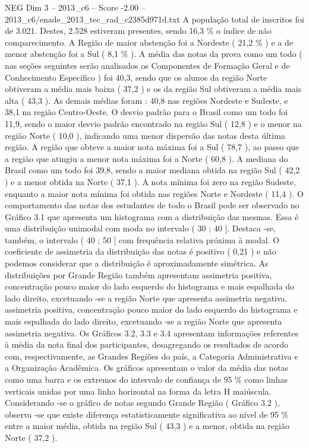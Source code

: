 \begin{textsample}{NEG Dim 3 – 2013\_c6 – Score -2.00 – 2013\_c6/enade\_2013\_tec\_rad\_c2385d971d.txt}
A população total de inscritos foi de 3.021.
Destes, 2.528 estiveram presentes, sendo 16,3 \% o índice de não comparecimento.
A Região de maior abstenção foi a Nordeste ( 21,2 \% ) e a de menor abstenção foi a Sul ( 8,1 \% ).
A média das notas da prova como um todo ( nas seções seguintes serão analisados os Componentes de Formação Geral e de Conhecimento Específico ) foi 40,3, sendo que os alunos da região Norte obtiveram a média mais baixa ( 37,2 ) e os da região Sul obtiveram a média mais alta ( 43,3 ).
As demais médias foram : 40,8 nas regiões Nordeste e Sudeste, e 38,1 na região Centro-Oeste.
O desvio padrão para o Brasil como um todo foi 11,9, sendo o maior desvio padrão encontrado na região Sul ( 12,8 ) e o menor na região Norte ( 10,0 ), indicando uma menor dispersão das notas desta última região.
A região que obteve a maior nota máxima foi a Sul ( 78,7 ), ao passo que a região que atingiu a menor nota máxima foi a Norte ( 60,8 ).
A mediana do Brasil como um todo foi 39,8, sendo a maior mediana obtida na região Sul ( 42,2 ) e a menor obtida na Norte ( 37,1 ).
A nota mínima foi zero na região Sudeste, enquanto a maior nota mínima foi obtida nas regiões Norte e Nordeste ( 11,4 ).
O comportamento das notas dos estudantes de todo o Brasil pode ser observado no Gráfico 3.1 que apresenta um histograma com a distribuição das mesmas.
Essa é uma distribuição unimodal com moda no intervalo ( 30 ; 40 ].
Destaca -se, também, o intervalo ( 40 ; 50 ] com frequência relativa próxima à modal.
O coeficiente de assimetria da distribuição das notas é positivo ( 0,21 ) e não podemos considerar que a distribuição é aproximadamente simétrica.
As distribuições por Grande Região também apresentam assimetria positiva, concentração pouco maior do lado esquerdo do histograma e mais espalhada do lado direito, excetuando -se a região Norte que apresenta assimetria negativa. assimetria positiva, concentração pouco maior do lado esquerdo do histograma e mais espalhada do lado direito, excetuando -se a região Norte que apresenta assimetria negativa.
Os Gráficos 3.2, 3.3 e 3.4 apresentam informações referentes à média da nota final dos participantes, desagregando os resultados de acordo com, respectivamente, as Grandes Regiões do país, a Categoria Administrativa e a Organização Acadêmica.
Os gráficos apresentam o valor da média das notas como uma barra e os extremos do intervalo de confiança de 95 \% como linhas verticais unidas por uma linha horizontal na forma da letra H maiúscula.
Considerando -se o gráfico de notas segundo Grande Região ( Gráfico 3.2 ), observa -se que existe diferença estatisticamente significativa ao nível de 95 \% entre a maior média, obtida na região Sul ( 43,3 ) e a menor, obtida na região Norte ( 37,2 ).

\end{textsample}
